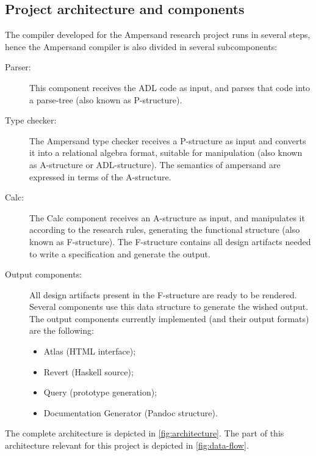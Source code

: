 \subsection{Project architecture and components}
\label{subsec:architecture}
The compiler developed for the Ampersand research project runs in several steps, hence the Ampersand compiler is also divided in several subcomponents:
%
%
%
%
\begin{description}
	\item[Parser:] This component receives the ADL code as input, and parses that code into a parse-tree (also known as P-structure).
	\item[Type checker:] The Ampersand type checker receives a P-structure as input and converts it into a relational algebra format, suitable for manipulation (also known as A-structure or ADL-structure).
		 The semantics of ampersand are expressed in terms of the A-structure.
	\item[Calc:] The Calc component receives an A-structure as input, and manipulates it according to the research rules, generating the functional structure (also known as F-structure).
		The F-structure contains all design artifacts needed to write a specification and generate the output.
	\item[Output components:] All design artifacts present in the F-structure are ready to be rendered.
		Several components use this data structure to generate the wished output.
		The output components currently implemented (and their output formats) are the following: 
		\begin{itemize}
			\item Atlas (HTML interface);
			\item Revert (Haskell source);
			\item Query (prototype generation);
			\item Documentation Generator (Pandoc structure).
		\end{itemize}
\end{description}
%
The complete architecture is depicted in \autoref{fig:architecture}.
The part of this architecture relevant for this project is depicted in \autoref{fig:data-flow}.

